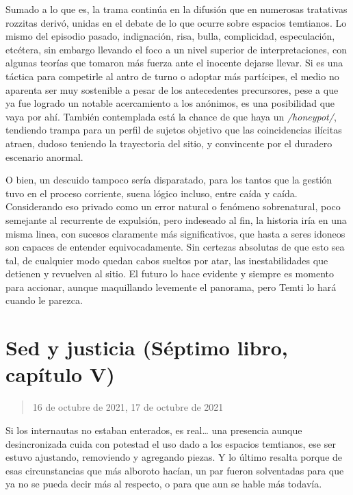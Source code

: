 \documentclass[
]{book}
\begin{document}
Sumado a lo que es, la trama continúa en la difusión que en numerosas tratativas rozzitas derivó, unidas en el debate de lo que ocurre sobre espacios temtianos. Lo mismo del episodio pasado, indignación, risa, bulla, complicidad, especulación, etcétera, sin embargo llevando el foco a un nivel superior de interpretaciones, con algunas teorías que tomaron más fuerza ante el inocente dejarse llevar. Si es una táctica para competirle al antro de turno o adoptar más partícipes, el medio no aparenta ser muy sostenible a pesar de los antecedentes precursores, pese a que ya fue logrado un notable acercamiento a los anónimos, es una posibilidad que vaya por ahí. También contemplada está la chance de que haya un \emph{/honeypot/}, tendiendo trampa para un perfil de sujetos objetivo que las coincidencias ilícitas atraen, dudoso teniendo la trayectoria del sitio, y convincente por el duradero escenario anormal.

O bien, un descuido tampoco sería disparatado, para los tantos que la gestión tuvo en el proceso corriente, suena lógico incluso, entre caída y caída. Considerando eso privado como un error natural o fenómeno sobrenatural, poco semejante al recurrente de expulsión, pero indeseado al fin, la historia iría en una misma linea, con sucesos claramente más significativos, que hasta a seres idoneos son capaces de entender equivocadamente. Sin certezas absolutas de que esto sea tal, de cualquier modo quedan cabos sueltos por atar, las inestabilidades que detienen y revuelven al sitio. El futuro lo hace evidente y siempre es momento para accionar, aunque maquillando levemente el panorama, pero Temti lo hará cuando le parezca.

\hypertarget{sed-y-justicia-suxe9ptimo-libro-capuxedtulo-v}{%
\section{Sed y justicia (Séptimo libro, capítulo V)}\label{sed-y-justicia-suxe9ptimo-libro-capuxedtulo-v}}

\begin{quote}
16 de octubre de 2021, 17 de octubre de 2021
\end{quote}

Si los internautas no estaban enterados, es real\ldots{} una presencia aunque desincronizada cuida con potestad el uso dado a los espacios temtianos, ese ser estuvo ajustando, removiendo y agregando piezas. Y lo último resalta porque de esas circunstancias que más alboroto hacían, un par fueron solventadas para que ya no se pueda decir más al respecto, o para que aun se hable más todavía.
\end{document}
